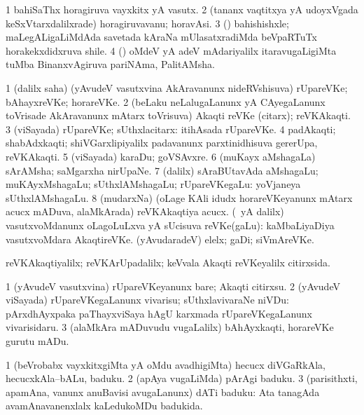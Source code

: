 \bentry
{}
\gl{\nA}
\bmng
\bnum
\num{1} bahiSaThx horagiruva vayxkitx yA vasutx. 
\num{2} (tananx vaqtitxya yA udoyxVgada keSxVtarxdalilxrade) horagiruvavanu; horavAsi. 
\num{3} (\BUvi) bahishishxle; maLegALigaLiMdAda savetada kAraNa mUlasatxradiMda beVpaRTuTx horakekxdidxruva shile. 
\num{4} (\saMshA) oMdeV yA adeV mAdariyalilx itaravugaLigiMta tuMba BinanxvAgiruva pariNAma, PalitAMsha. 
\enum
\emng
\eentry

\bentry
{}
\gl{\nA}
\bmng
\bnum
\num{1} (\bava dalilx saha) (yAvudeV vasutxvina AkAravanunx nideRVshisuva) rUpareVKe; bAhayxreVKe; horareVKe. 
\num{2} (beLaku neLalugaLanunx yA CAyegaLanunx toVrisade AkAravanunx mAtarx toVrisuva) Akaqti reVKe (citarx); reVKAkaqti. 
\num{3} (viSayada) rUpareVKe; sUthxlacitarx:  itihAsada rUpareVKe. 
\num{4} padAkaqti; shabAdxkaqti; shiVGarxlipiyalilx padavanunx parxtinidhisuva gererUpa, reVKAkaqti. 
\num{5} (viSayada) karaDu; goVSAvxre. 
\num{6} (muKayx aMshagaLa) sArAMsha; saMgarxha nirUpaNe. 
\num{7} (\bava dalilx) sAraBUtavAda aMshagaLu; muKAyxMshagaLu; sUthxlAMshagaLu; rUpareVKegaLu:  yoVjaneya sUthxlAMshagaLu. 
\num{8} (mudarxNa) (oLage KAli idudx horareVKeyanunx mAtarx acucx mADuva, alaMkArada) reVKAkaqtiya acucx. 
 (\Eva\ yA \bava dalilx) 
\banum
{} vasutxvoMdanunx oLagoLuLxva yA sUcisuva reVKe(gaLu):  kaMbaLiyaDiya vasutxvoMdara AkaqtireVKe. 
 (yAvudaradeV) elelx; gaDi; siVmAreVKe. 
\eanum
\numie
\enum
\emng

\noindent
\gl{\pagu}
\bmng
{} reVKAkaqtiyalilx; reVKArUpadalilx; keVvala Akaqti reVKeyalilx citirxsida. 
\emng
\eentry

\bentry
{}
\gl{\sakirx}
\bmng
\bnum
\num{1} (yAvudeV vasutxvina) rUpareVKeyanunx bare; Akaqti citirxsu. 
\num{2} (yAvudeV viSayada) rUpareVKegaLanunx vivarisu; sUthxlavivaraNe niVDu:  pArxdhAyxpaka paThayxviSaya hAgU karxmada rUpareVKegaLanunx vivarisidaru. 
\num{3} (alaMkAra mADuvudu \mo vugaLalilx) bAhAyxkaqti, horareVKe gurutu mADu. 
\enum
\emng
\eentry

\bentry
{}
\gl{\sakirx}
\bmng
\bnum
\num{1} (beVrobabx vayxkitxgiMta yA oMdu avadhigiMta) hecucx diVGaRkAla, hecucxkAla--bALu, baduku. 
\num{2} (apAya \mo vugaLiMda) pArAgi baduku. 
\num{3} (parisithxti, apamAna, \mo vanunx anuBavisi avugaLanunx) dATi baduku:  Ata tanagAda avamAnavanenxlalx kaLedukoMDu badukida. 
\enum
\emng
\eentry

